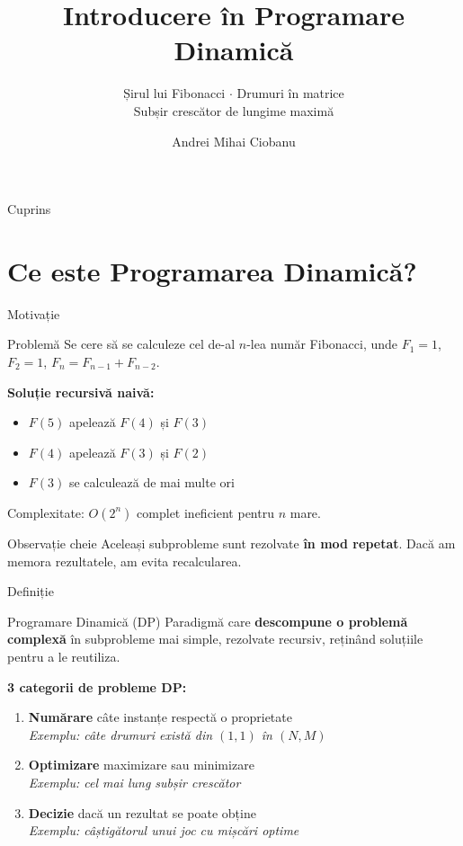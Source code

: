 \documentclass{beamer}
\title{Introducere în Programare Dinamică}
\subtitle{Șirul lui Fibonacci $\cdot$ Drumuri în matrice \\ Subșir crescător de lungime maximă}
\author{Andrei Mihai Ciobanu}
\institute{Algolymp Summer School}
\date{}
\begin{document}
\begin{frame}
  \titlepage
\end{frame}

\begin{frame}{Cuprins}
  \tableofcontents[hideallsubsections]
\end{frame}

\section{Ce este Programarea Dinamică?}

\begin{frame}{Motivație}
  \begin{block}{Problemă}
    Se cere să se calculeze cel de-al $n$-lea număr Fibonacci,
    unde $F_1 = 1$, $F_2 = 1$, $F_n = F_{n-1} + F_{n-2}$.
  \end{block}
  \smallskip
  \textbf{Soluție recursivă naivă:}
  \begin{itemize}
    \item $F(5)$ apelează $F(4)$ și $F(3)$
    \item $F(4)$ apelează $F(3)$ și $F(2)$
    \item $F(3)$ se calculează de \alert{mai multe ori}
  \end{itemize}
  \smallskip
  Complexitate: $O(2^n)$ \textemdash{} complet ineficient pentru $n$ mare.
  \begin{alertblock}{Observație cheie}
    Aceleași subprobleme sunt rezolvate \textbf{în mod repetat}.
    Dacă am memora rezultatele, am evita recalcularea.
  \end{alertblock}
\end{frame}

\begin{frame}{Definiție}
  \begin{block}{Programare Dinamică (DP)}
    Paradigmă care \textbf{descompune o problemă complexă} în subprobleme
    mai simple, rezolvate recursiv, reținând soluțiile pentru a le reutiliza.
  \end{block}
  \smallskip
  \textbf{3 categorii de probleme DP:}
  \begin{enumerate}\itemsep4pt
    \item \textbf{Numărare} \textemdash{} câte instanțe respectă o proprietate \\
          {\small\textit{Exemplu: câte drumuri există din $(1,1)$ în $(N,M)$}}
    \item \textbf{Optimizare} \textemdash{} maximizare sau minimizare \\
          {\small\textit{Exemplu: cel mai lung subșir crescător}}
    \item \textbf{Decizie} \textemdash{} dacă un rezultat se poate obține \\
          {\small\textit{Exemplu: câștigătorul unui joc cu mișcări optime}}
  \end{enumerate}
\end{frame}
\end{document}
